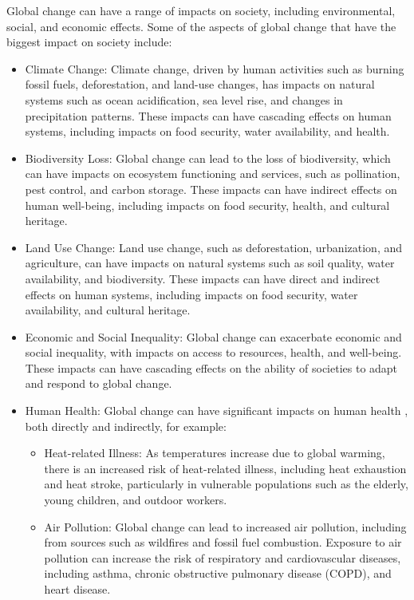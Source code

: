 Global change can have a range of impacts on society, including environmental, social, and economic effects. Some of the aspects of global change that have the biggest impact on society include:

\begin{itemize}
\item Climate Change: Climate change, driven by human activities such as burning fossil fuels, deforestation, and land-use changes, has impacts on natural systems such as ocean acidification, sea level rise, and changes in precipitation patterns. These impacts can have cascading effects on human systems, including impacts on food security, water availability, and health.
\item Biodiversity Loss: Global change can lead to the loss of biodiversity, which can have impacts on ecosystem functioning and services, such as pollination, pest control, and carbon storage. These impacts can have indirect effects on human well-being, including impacts on food security, health, and cultural heritage.
\item Land Use Change: Land use change, such as deforestation, urbanization, and agriculture, can have impacts on natural systems such as soil quality, water availability, and biodiversity. These impacts can have direct and indirect effects on human systems, including impacts on food security, water availability, and cultural heritage.
\item Economic and Social Inequality: Global change can exacerbate economic and social inequality, with impacts on access to resources, health, and well-being. These impacts can have cascading effects on the ability of societies to adapt and respond to global change.
\item Human Health: Global change can have significant impacts on human health \cite{WHO2018, Costello2009, Haines2006}, both directly and indirectly, for example:
  \begin{itemize}
  \item Heat-related Illness: As temperatures increase due to global warming, there is an increased risk of heat-related illness, including heat exhaustion and heat stroke, particularly in vulnerable populations such as the elderly, young children, and outdoor workers.
  \item Air Pollution: Global change can lead to increased air pollution, including from sources such as wildfires and fossil fuel combustion. Exposure to air pollution can increase the risk of respiratory and cardiovascular diseases, including asthma, chronic obstructive pulmonary disease (COPD), and heart disease.

\end{itemize}
\end{itemize}

